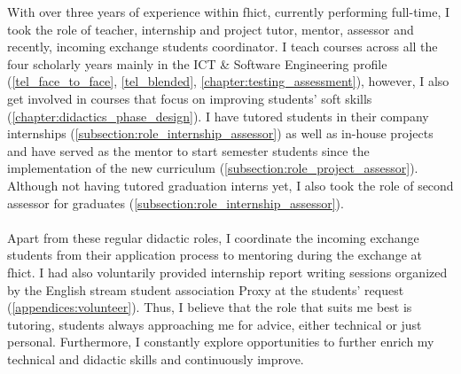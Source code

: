 With over three years of experience within \acrshort{fhict}, currently performing full-time, I took the role of teacher, internship and project tutor, mentor, assessor and recently, incoming exchange students coordinator. 
I teach courses across all the four scholarly years mainly in the ICT \& Software Engineering profile (\cref{tel_face_to_face}, \ref{tel_blended}, \ref{chapter:testing_assessment}), however, I also get involved in courses that focus on improving students' soft skills (\cref{chapter:didactics_phase_design}). %
I have tutored students in their company internships (\cref{subsection:role_internship_assessor}) as well as in-house projects and have served as the mentor to start semester students since the implementation of the new curriculum (\cref{subsection:role_project_assessor}).  Although not having tutored graduation interns yet, I also took the role of second assessor for graduates (\cref{subsection:role_internship_assessor}). \\\\
Apart from these regular didactic roles, I coordinate the incoming exchange students from their application process to mentoring during the exchange at \acrshort{fhict}. 
I had also voluntarily provided internship report writing sessions organized by the English stream student association Proxy at the students' request (\cref{appendices:volunteer}). Thus, I believe that the role that suits me best is tutoring, students always approaching me for advice, either technical or just personal.
Furthermore, I constantly explore opportunities to further enrich my technical and didactic skills and continuously improve.


